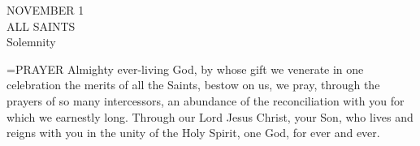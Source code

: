 \begin{center}\normalsize NOVEMBER 1\\
\footnotesize ALL SAINTS\\
\footnotesize Solemnity\\
\end{center}

\hangindent=\parindent \small{PRAYER 
Almighty ever-living God,
by whose gift we venerate in one celebration
the merits of all the Saints,
bestow on us, we pray,
through the prayers of so many intercessors,
an abundance of the reconciliation with you
for which we earnestly long.
Through our Lord Jesus Christ, your Son,
who lives and reigns with you in the unity of the Holy Spirit,
one God, for ever and ever.\\}
 
